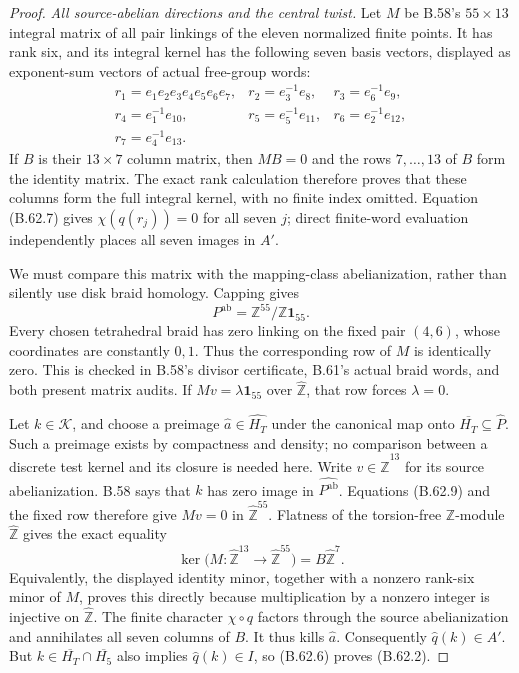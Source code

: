 \begin{proof}
\emph{All source-abelian directions and the central twist.}
Let $M$ be B.58's $55\times13$ integral matrix of all
pair linkings of the eleven normalized finite points.
It has rank six, and its integral kernel has the following
seven basis vectors, displayed as exponent-sum vectors
of actual free-group words:
\[
\begin{array}{lll}
 r_1=e_1e_2e_3e_4e_5e_6e_7,&
 r_2=e_3^{-1}e_8,&r_3=e_6^{-1}e_9,\\
 r_4=e_1^{-1}e_{10},&r_5=e_5^{-1}e_{11},&
 r_6=e_2^{-1}e_{12},\\
 r_7=e_4^{-1}e_{13}.&&
\end{array}                                                 \tag{B.62.8}
\]
If $B$ is their $13\times7$ column matrix, then $MB=0$
and the rows $7,\ldots,13$ of $B$ form the identity matrix.
The exact rank calculation therefore proves that these
columns form the full integral kernel, with no finite
index omitted.  Equation (B.62.7) gives
$\chi(q(r_j))=0$ for all seven $j$; direct finite-word
evaluation independently places all seven images in $A'$.

We must compare this matrix with the mapping-class
abelianization, rather than silently use disk braid
homology.  Capping gives
\[
 P^{\mathrm{ab}}
     =\mathbb Z^{55}/\mathbb Z\mathbf1_{55}.
                                                               \tag{B.62.9}
\]
Every chosen tetrahedral braid has zero linking on the
fixed pair $(4,6)$, whose coordinates are constantly
$0,1$.  Thus the corresponding row of $M$ is identically
zero.  This is checked in B.58's divisor certificate,
B.61's actual braid words, and both present matrix
audits.  If $Mv=\lambda\mathbf1_{55}$ over
$\widehat{\mathbb Z}$, that row forces $\lambda=0$.

Let $k\in\mathcal K$, and choose a preimage
$\hat a\in\widehat{H_T}$ under the canonical map onto
$\overline{H_T}\subseteq\widehat P$.
Such a preimage exists by compactness and density;
no comparison between a discrete test kernel and its
closure is needed here.
Write $v\in\widehat{\mathbb Z}^{13}$ for its source
abelianization.  B.58 says that $k$ has zero image in
$\widehat{P^{\mathrm{ab}}}$.
Equations (B.62.9) and the fixed row therefore give
$Mv=0$ in $\widehat{\mathbb Z}^{55}$.
Flatness of the torsion-free $\mathbb Z$-module
$\widehat{\mathbb Z}$ gives the exact equality
\[
 \ker\bigl(M:\widehat{\mathbb Z}^{13}
                    \to\widehat{\mathbb Z}^{55}\bigr)
                       =B\widehat{\mathbb Z}^{7}.            \tag{B.62.10}
\]
Equivalently, the displayed identity minor, together
with a nonzero rank-six minor of $M$, proves this directly
because multiplication by a nonzero integer is injective
on $\widehat{\mathbb Z}$.
The finite character $\chi\circ q$ factors through the
source abelianization and annihilates all seven columns
of $B$.  It thus kills $\hat a$.
Consequently $\widehat q(k)\in A'$.
But $k\in\overline{H_T}\cap\overline{H_5}$ also implies
$\widehat q(k)\in I$, so (B.62.6) proves (B.62.2).


\end{proof}

